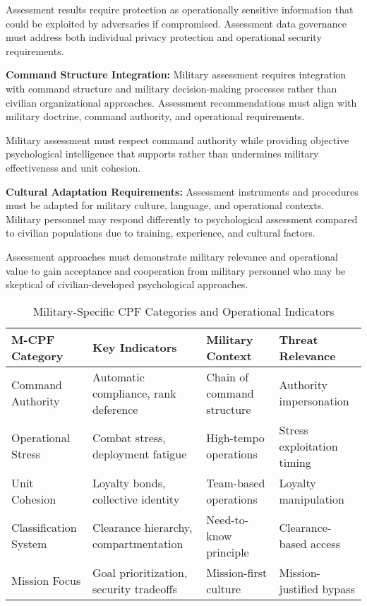 \documentclass[10pt, twocolumn]{article}
\begin{document}
Assessment results require protection as operationally sensitive information that could be exploited by adversaries if compromised. Assessment data governance must address both individual privacy protection and operational security requirements.

\textbf{Command Structure Integration:} Military assessment requires integration with command structure and military decision-making processes rather than civilian organizational approaches. Assessment recommendations must align with military doctrine, command authority, and operational requirements.

Military assessment must respect command authority while providing objective psychological intelligence that supports rather than undermines military effectiveness and unit cohesion.

\textbf{Cultural Adaptation Requirements:} Assessment instruments and procedures must be adapted for military culture, language, and operational contexts. Military personnel may respond differently to psychological assessment compared to civilian populations due to training, experience, and cultural factors.

Assessment approaches must demonstrate military relevance and operational value to gain acceptance and cooperation from military personnel who may be skeptical of civilian-developed psychological approaches.

\begin{table*}[t]
\caption{Military-Specific CPF Categories and Operational Indicators}
\label{tab:military_cpf_categories}
\centering
\begin{tabular}{@{}l l l l@{}}
\toprule
\textbf{M-CPF Category} & \textbf{Key Indicators} & \textbf{Military Context} & \textbf{Threat Relevance} \\
\midrule
Command Authority & Automatic compliance, rank deference & Chain of command structure & Authority impersonation \\
\midrule
Operational Stress & Combat stress, deployment fatigue & High-tempo operations & Stress exploitation timing \\
\midrule
Unit Cohesion & Loyalty bonds, collective identity & Team-based operations & Loyalty manipulation \\
\midrule
Classification System & Clearance hierarchy, compartmentation & Need-to-know principle & Clearance-based access \\
\midrule
Mission Focus & Goal prioritization, security tradeoffs & Mission-first culture & Mission-justified bypass \\
\bottomrule
\end{tabular}
\end{table*}
\end{document}
